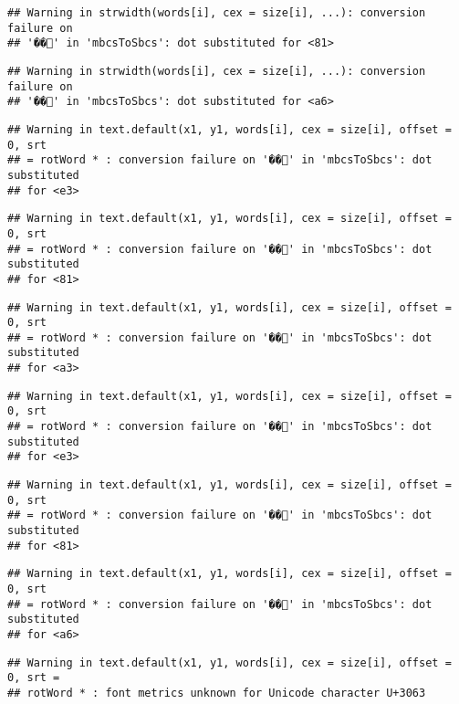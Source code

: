 \documentclass[]{article}
\begin{document}
\begin{verbatim}
## Warning in strwidth(words[i], cex = size[i], ...): conversion failure on
## '��' in 'mbcsToSbcs': dot substituted for <81>
\end{verbatim}

\begin{verbatim}
## Warning in strwidth(words[i], cex = size[i], ...): conversion failure on
## '��' in 'mbcsToSbcs': dot substituted for <a6>
\end{verbatim}

\begin{verbatim}
## Warning in text.default(x1, y1, words[i], cex = size[i], offset = 0, srt
## = rotWord * : conversion failure on '��' in 'mbcsToSbcs': dot substituted
## for <e3>
\end{verbatim}

\begin{verbatim}
## Warning in text.default(x1, y1, words[i], cex = size[i], offset = 0, srt
## = rotWord * : conversion failure on '��' in 'mbcsToSbcs': dot substituted
## for <81>
\end{verbatim}

\begin{verbatim}
## Warning in text.default(x1, y1, words[i], cex = size[i], offset = 0, srt
## = rotWord * : conversion failure on '��' in 'mbcsToSbcs': dot substituted
## for <a3>
\end{verbatim}

\begin{verbatim}
## Warning in text.default(x1, y1, words[i], cex = size[i], offset = 0, srt
## = rotWord * : conversion failure on '��' in 'mbcsToSbcs': dot substituted
## for <e3>
\end{verbatim}

\begin{verbatim}
## Warning in text.default(x1, y1, words[i], cex = size[i], offset = 0, srt
## = rotWord * : conversion failure on '��' in 'mbcsToSbcs': dot substituted
## for <81>
\end{verbatim}

\begin{verbatim}
## Warning in text.default(x1, y1, words[i], cex = size[i], offset = 0, srt
## = rotWord * : conversion failure on '��' in 'mbcsToSbcs': dot substituted
## for <a6>
\end{verbatim}

\begin{verbatim}
## Warning in text.default(x1, y1, words[i], cex = size[i], offset = 0, srt =
## rotWord * : font metrics unknown for Unicode character U+3063
\end{verbatim}
\end{document}
